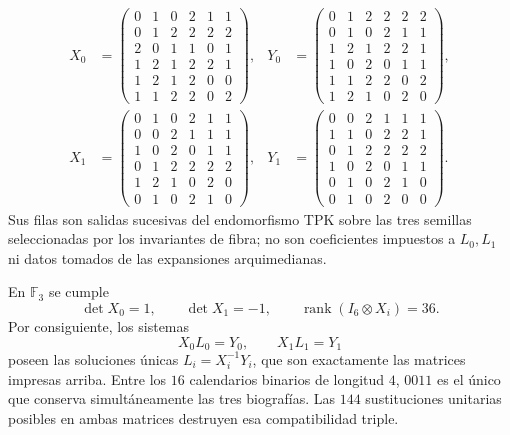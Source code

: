 \begin{equation}
\begin{aligned}
X_0&=\begin{pmatrix}
0&1&0&2&1&1\\0&1&2&2&2&2\\2&0&1&1&0&1\\
1&2&1&2&2&1\\1&2&1&2&0&0\\1&1&2&2&0&2
\end{pmatrix},&
Y_0&=\begin{pmatrix}
0&1&2&2&2&2\\0&1&0&2&1&1\\1&2&1&2&2&1\\
1&0&2&0&1&1\\1&1&2&2&0&2\\1&2&1&0&2&0
\end{pmatrix},\\[1ex]
X_1&=\begin{pmatrix}
0&1&0&2&1&1\\0&0&2&1&1&1\\1&0&2&0&1&1\\
0&1&2&2&2&2\\1&2&1&0&2&0\\0&1&0&2&1&0
\end{pmatrix},&
Y_1&=\begin{pmatrix}
0&0&2&1&1&1\\1&1&0&2&2&1\\0&1&2&2&2&2\\
1&0&2&0&1&1\\0&1&0&2&1&0\\0&1&0&2&0&0
\end{pmatrix}.
\end{aligned}
\label{eq:registro-transiciones-tpk-explicito-rev10}
\end{equation}
\endgroup
Sus filas son salidas sucesivas del endomorfismo TPK sobre las tres semillas
seleccionadas por los invariantes de fibra; no son coeficientes impuestos a
\(L_0,L_1\) ni datos tomados de las expansiones arquimedianas.

\begin{theorem}
\label{thm:reconstruccion-lifts-calendario-rev10}
En \(\mathbb F_3\) se cumple
\[
 \det X_0=1,
 \qquad \det X_1=-1,
 \qquad \operatorname{rank}(I_6\otimes X_i)=36.
\]
Por consiguiente, los sistemas
\[
 X_0L_0=Y_0,
 \qquad X_1L_1=Y_1
\]
poseen las soluciones únicas \(L_i=X_i^{-1}Y_i\), que son exactamente las
matrices impresas arriba. Entre los \(16\) calendarios binarios de longitud
\(4\), \(0011\) es el único que conserva simultáneamente las tres
biografías. Las \(144\) sustituciones unitarias posibles en ambas matrices
destruyen esa compatibilidad triple.
\end{theorem}

